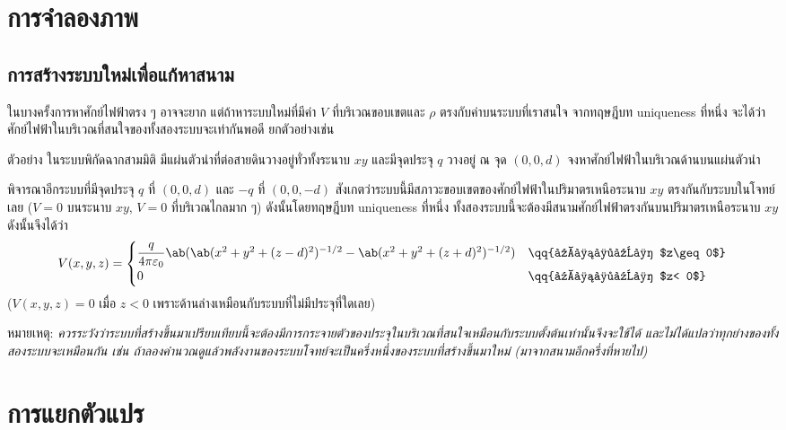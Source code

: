 \section{การจำลองภาพ}
\subsection{การสร้างระบบใหม่เพื่อแก้หาสนาม}
ในบางครั้งการหาศักย์ไฟฟ้าตรง ๆ อาจจะยาก แต่ถ้าหาระบบใหม่ที่มีค่า $V$ ที่บริเวณขอบเขตและ $\rho$ ตรงกับค่าบนระบบที่เราสนใจ จากทฤษฎีบท uniqueness ที่หนึ่ง จะได้ว่าศักย์ไฟฟ้าในบริเวณที่สนใจของทั้งสองระบบจะเท่ากันพอดี ยกตัวอย่างเช่น

\begin{corbox}{ตัวอย่าง}
    ในระบบพิกัดฉากสามมิติ มีแผ่นตัวนำที่ต่อสายดินวางอยู่ทั่วทั้งระนาบ $xy$ และมีจุดประจุ $q$ วางอยู่ ณ จุด $(0,0,d)$ จงหาศักย์ไฟฟ้าในบริเวณด้านบนแผ่นตัวนำ
\end{corbox}
\begin{soln}
    พิจารณาอีกระบบที่มีจุดประจุ $q$ ที่ $(0,0,d)$ และ $-q$ ที่ $(0,0,-d)$ สังเกตว่าระบบนี้มีสภาวะขอบเขตของศักย์ไฟฟ้าในปริมาตรเหนือระนาบ $xy$ ตรงกันกับระบบในโจทย์เลย ($V=0$ บนระนาบ $xy$, $V=0$ ที่บริเวณไกลมาก ๆ) ดังนั้นโดยทฤษฎีบท uniqueness ที่หนึ่ง ทั้งสองระบบนี้จะต้องมีสนามศักย์ไฟฟ้าตรงกันบนปริมาตรเหนือระนาบ $xy$\\
    ดังนั้นจึงได้ว่า
    \[
    V(x,y,z)=\begin{cases}
        \dfrac{q}{4\pi\eps_0}\ab(\ab(x^2+y^2+(z-d)^2)^{-1/2}-\ab(x^2+y^2+(z+d)^2)^{-1/2})&\qq{เมื่อ $z\geq0$}\\
        0&\qq{เมื่อ $z< 0$}
    \end{cases}
    \]
    ($V(x,y,z)=0$ เมื่อ $z<0$ เพราะด้านล่างเหมือนกับระบบที่ไม่มีประจุที่ใดเลย)
\end{soln}
หมายเหตุ: \emph{ควรระวังว่าระบบที่สร้างขึ้นมาเปรียบเทียบนี้จะต้องมีการกระจายตัวของประจุในบริเวณที่สนใจเหมือนกับระบบตั้งต้นเท่านั้นจึงจะใช้ได้ และไม่ได้แปลว่าทุกย่างของทั้งสองระบบจะเหมือนกัน เช่น ถ้าลองคำนวณดูแล้วพลังงานของระบบโจทย์จะเป็นครึ่งหนึ่งของระบบที่สร้างขึ้นมาใหม่ (มาจากสนามอีกครึ่งที่หายไป)}
\section{การแยกตัวแปร}
